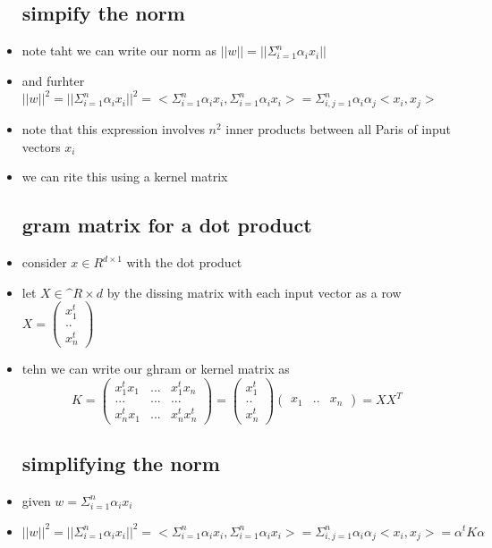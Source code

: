 \documentclass{article}
\begin{document}
\begin{itemize}
\subsection{simpify the norm}
\item note taht we can write our norm as $||w||=||\Sigma_{i=1}^{n}\alpha_{i}x_{i}||$
\item and furhter $||w||^{2}=||\Sigma_{i=1}^{n}\alpha_{i}x_{i}||^{2}=<\Sigma_{i=1}^{n}\alpha_{i}x_{i},\Sigma_{i=1}^{n}\alpha_{i}x_{i}>=\Sigma_{i,j=1}^{n}\alpha_{i}\alpha_{j}<x_i,x_j>$
\item note that this expression involves $n^2$ inner products between all Paris of input vectors $x_i$
\item we can rite this using a kernel matrix 
\subsection{gram matrix for a dot product}
\item consider $x\in R^{d\times 1}$ with the dot product
\item let $X\in \mathbb^{R\times d}$ by the dissing matrix with each input vector as a row $X=\begin{pmatrix}
    x_1^t\\..\\x_n^t
\end{pmatrix}$
\item tehn we can write our ghram or kernel matrix as $$K=\begin{pmatrix}
    x_1^{t}x_1&...&x_1^{t}x_n\\
    ... &...&...\\
    x_n^{t}x_1&...&x_{n}^{t}x_{n}^{t}
\end{pmatrix}=\begin{pmatrix}
    x_1^t\\..\\x_n^t
\end{pmatrix}\begin{pmatrix}
    x_1&..&x_n
\end{pmatrix}=XX^{T}$$
\subsection{simplifying the norm }
\item given $w=\Sigma_{i=1}^{n}\alpha_{i}x_{i}$
\item $||w||^{2}=||\Sigma_{i=1}^{n}\alpha_{i}x_{i}||^{2}=<\Sigma_{i=1}^{n}\alpha_{i}x_{i},\Sigma_{i=1}^{n}\alpha_{i}x_{i}>=\Sigma_{i,j=1}^{n}\alpha_{i}\alpha_{j}<x_i,x_j>=\alpha^{t}K\alpha$

\end{itemize}
\end{document}

